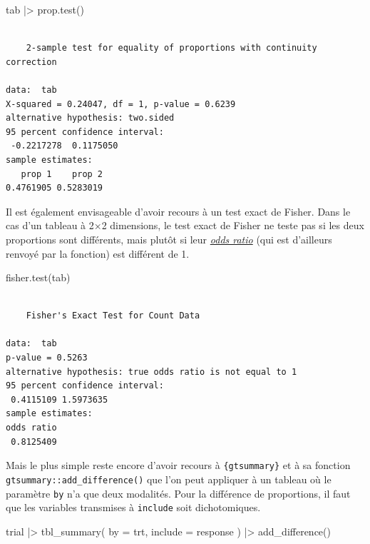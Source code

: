 \documentclass[
  letterpaper,
  DIV=11,
  numbers=noendperiod,
  oneside]{scrreprt}
\newenvironment{Shaded}{\begin{snugshade}}{\end{snugshade}}
\newcommand{\AttributeTok}[1]{\textcolor[rgb]{0.40,0.45,0.13}{#1}}
\newcommand{\FunctionTok}[1]{\textcolor[rgb]{0.28,0.35,0.67}{#1}}
\newcommand{\NormalTok}[1]{\textcolor[rgb]{0.00,0.23,0.31}{#1}}
\newcommand{\SpecialCharTok}[1]{\textcolor[rgb]{0.37,0.37,0.37}{#1}}
\begin{document}
\begin{Shaded}
\begin{Highlighting}[]
\NormalTok{tab }\SpecialCharTok{|\textgreater{}} \FunctionTok{prop.test}\NormalTok{()}
\end{Highlighting}
\end{Shaded}

\begin{verbatim}

    2-sample test for equality of proportions with continuity correction

data:  tab
X-squared = 0.24047, df = 1, p-value = 0.6239
alternative hypothesis: two.sided
95 percent confidence interval:
 -0.2217278  0.1175050
sample estimates:
   prop 1    prop 2 
0.4761905 0.5283019 
\end{verbatim}

Il est également envisageable d'avoir recours à un test exact de Fisher.
Dans le cas d'un tableau à 2×2 dimensions, le test exact de Fisher ne
teste pas si les deux proportions sont différents, mais plutôt si leur
\href{https://fr.wikipedia.org/wiki/Odds_ratio}{\emph{odds ratio}} (qui
est d'ailleurs renvoyé par la fonction) est différent de 1.

\begin{Shaded}
\begin{Highlighting}[]
\FunctionTok{fisher.test}\NormalTok{(tab)}
\end{Highlighting}
\end{Shaded}

\begin{verbatim}

    Fisher's Exact Test for Count Data

data:  tab
p-value = 0.5263
alternative hypothesis: true odds ratio is not equal to 1
95 percent confidence interval:
 0.4115109 1.5973635
sample estimates:
odds ratio 
 0.8125409 
\end{verbatim}

Mais le plus simple reste encore d'avoir recours à
\texttt{\{gtsummary\}} et à sa fonction
\texttt{gtsummary::add\_difference()} que l'on peut appliquer à un
tableau où le paramètre \texttt{by} n'a que deux modalités. Pour la
différence de proportions, il faut que les variables transmises à
\texttt{include} soit dichotomiques.

\begin{Shaded}
\begin{Highlighting}[]
\NormalTok{trial }\SpecialCharTok{|\textgreater{}} 
  \FunctionTok{tbl\_summary}\NormalTok{(}
    \AttributeTok{by =}\NormalTok{ trt,}
    \AttributeTok{include =}\NormalTok{ response}
\NormalTok{  ) }\SpecialCharTok{|\textgreater{}} 
  \FunctionTok{add\_difference}\NormalTok{()}
\end{Highlighting}
\end{Shaded}
\end{document}
